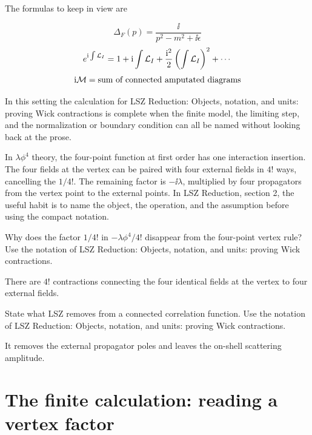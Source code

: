 The formulas to keep in view are

\[
  \Delta_F(p)=\frac{\ii}{p^2-m^2+\ii\epsilon}
\]
\[
  e^{\mathrm i\int\mathcal L_I}=1+\mathrm i\int\mathcal L_I+\frac{\mathrm i^2}{2}\left(\int\mathcal L_I\right)^2+\cdots
\]
\[
  \mathrm i\mathcal M=\hbox{sum of connected amputated diagrams}
\]

In this setting the calculation for LSZ Reduction: Objects, notation, and units: proving Wick contractions is complete when the finite model, the limiting step, and the normalization or boundary condition can all be named without looking back at the prose.




\begin{example}
In \(\lambda\phi^4\) theory, the four-point function at first order has one interaction insertion.  The four fields at the vertex can be paired with four external fields in \(4!\) ways, cancelling the \(1/4!\).  The remaining factor is \(-\ii\lambda\), multiplied by four propagators from the vertex point to the external points.  In LSZ Reduction, section 2, the useful habit is to name the object, the operation, and the assumption before using the compact notation.
\end{example}



\begin{exercise}
Why does the factor \(1/4!\) in \(-\lambda\phi^4/4!\) disappear from the four-point vertex rule?  Use the notation of LSZ Reduction: Objects, notation, and units: proving Wick contractions.
\begin{answer}
There are \(4!\) contractions connecting the four identical fields at the vertex to four external fields.
\end{answer}
\end{exercise}

\begin{exercise}
State what LSZ removes from a connected correlation function.  Use the notation of LSZ Reduction: Objects, notation, and units: proving Wick contractions.
\begin{answer}
It removes the external propagator poles and leaves the on-shell scattering amplitude.
\end{answer}
\end{exercise}



\section{The finite calculation: reading a vertex factor}

